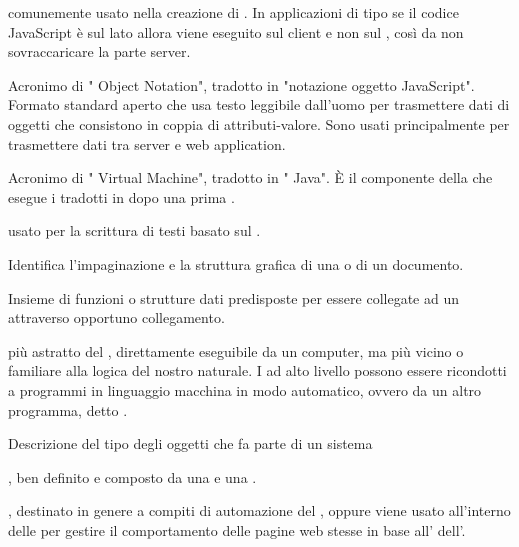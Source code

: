 {  comunemente usato nella creazione di . In applicazioni di tipo  se il codice JavaScript è sul lato  allora viene eseguito sul client e non sul , così da non sovraccaricare la parte server.}

{Acronimo di " Object Notation", tradotto in "notazione oggetto JavaScript". Formato standard aperto che usa testo leggibile dall'uomo per trasmettere dati di oggetti che consistono in coppia di attributi-valore. Sono usati principalmente per trasmettere dati tra server e web application.}

{Acronimo di " Virtual Machine", tradotto in " Java". \`{E} il componente della  che esegue i  tradotti in  dopo una prima .}




{ usato per la scrittura di testi basato sul  .}

{Identifica l'impaginazione e la struttura grafica di una  o di un documento.}

{Insieme di funzioni o strutture dati predisposte per essere collegate ad un   attraverso opportuno collegamento.}

{ più astratto del , direttamente eseguibile da un computer, ma più vicino o familiare alla logica del nostro  naturale. I  ad alto livello possono essere ricondotti a programmi in linguaggio macchina in modo automatico, ovvero da un altro programma, detto .}

Descrizione del tipo degli oggetti che fa parte di un sistema 

{, ben definito e composto da una  e una .}

{, destinato in genere a compiti di automazione del , oppure viene usato all'interno delle  per gestire il comportamento delle pagine web stesse in base all'  dell'.}


